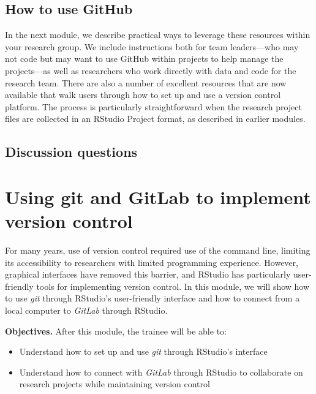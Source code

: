 \documentclass[]{tufte-book}
\providecommand{\tightlist}{%
  \setlength{\itemsep}{0pt}\setlength{\parskip}{0pt}}
\begin{document}
\hypertarget{how-to-use-github}{%
\subsection{How to use GitHub}\label{how-to-use-github}}

In the next module, we describe practical ways to leverage these resources
within your research group. We include instructions both for team leaders---who
may not code but may want to use GitHub within projects to help manage the
projects---as well as researchers who work directly with data and code for the
research team. There are also a number of excellent resources that are now
available that walk users through how to set up and use a version control
platform. The process is particularly straightforward when the research project
files are collected in an RStudio Project format, as described in earlier
modules.

\hypertarget{discussion-questions-4}{%
\subsection{Discussion questions}\label{discussion-questions-4}}

\hypertarget{module11}{%
\section{Using git and GitLab to implement version control}\label{module11}}

For many years, use of version control required use of the command line,
limiting its accessibility to researchers with limited programming experience.
However, graphical interfaces have removed this barrier, and RStudio has
particularly user-friendly tools for implementing version control. In this
module, we will show how to use \emph{git} through RStudio's user-friendly
interface and how to connect from a local computer to \emph{GitLab} through
RStudio.

\textbf{Objectives.} After this module, the trainee will be able to:

\begin{itemize}
\tightlist
\item
  Understand how to set up and use \emph{git} through RStudio's interface
\item
  Understand how to connect with \emph{GitLab} through RStudio to collaborate on\\
  research projects while maintaining version control
\end{itemize}
\end{document}

